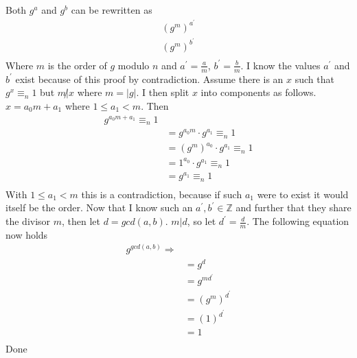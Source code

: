 \documentclass{article}
\begin{document}
\section{}
Both $g^{a}$ and $g^{b}$ can be rewritten as 
\[
\begin{split}
(g^{m})^{a^{\prime}} \\
(g^{m})^{b^{\prime}} \\
\end{split}
\]
Where $m$ is the order of $g$ modulo $n$ and
$a^{\prime} = \frac{a}{m}$, 
$b^{\prime} = \frac{b}{m}$.
\newline
I know the values $a^{\prime}$ and $b^{\prime}$ exist because of this proof by contradiction.
\newline
Assume there is an $x$ such that $g^{x} \equiv_{n} 1$ but $m \not| x$ where $m = |g|$.
I then split $x$ into components as follows. $x = a_{0}m + a_{1}$ where $1 \le a_{1} < m$. Then
\[
\begin{split}
g^{a_{0}m + a_{1}} \equiv_{n} 1 & \\
&= g^{a_{0}m} \cdot g^{a_{1}} \equiv_{n} 1\\
&= (g^{m})^{a_{0}} \cdot g^{a_{1}} \equiv_{n} 1\\
&= 1^{a_{0}} \cdot g^{a_{1}} \equiv_{n} 1\\
&= g^{a_{1}} \equiv_{n} 1\\
\end{split}
\]
With $1 \le a_{1} < m$ this is a contradiction, because if such $a_{1}$ were to exist it would itself be the order.
\newline
Now that I know such an $a^{\prime}, b^{\prime} \in \mathbb{Z}$ and further that they share the divisor $m$,
then let $d = gcd(a, b)$. $m|d$, so let $d^{\prime} = \frac{d}{m}$. The following equation now holds
\[
\begin{split}
g^{gcd(a,b)} \Rightarrow& \\
&= g^{d} \\
&= g^{md^{\prime}} \\
&= (g^{m})^{d^{\prime}} \\
&= (1)^{d^{\prime}} \\
&= 1 \\
\end{split}
\]
Done

\newpage
\end{document}
